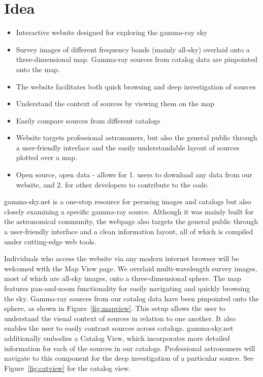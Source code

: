 \section{Idea}

\begin{itemize}

\item Interactive website designed for exploring the gamma-ray sky

\item Survey images of different frequency bands (mainly all-sky) overlaid onto a three-dimensional map. Gamma-ray sources from catalog data are pinpointed onto the map.

\item The website facilitates both quick browsing and deep investigation of sources

\item Understand the context of sources by viewing them on the map

\item Easily compare sources from different catalogs

\item Website targets professional astronomers, but also the general public through
a user-friendly interface and the easily understandable layout of sources plotted over a map.

\item Open source, open data - allows for 1. users to download any data from our website, and 2. for other developers to contribute to the code.

\end{itemize}


    gamma-sky.net is a one-stop resource for perusing images and catalogs but also closely examining a specific gamma-ray source.
    Although it was mainly built for the astronomical community, the webpage also targets the general public through a
    user-friendly interface and a clean information layout, all of which is compiled under cutting-edge web tools.

    Individuals who access the website via any modern internet browser will be welcomed with the Map View page.
    We overlaid multi-wavelength survey images, most of which are all-sky images, onto a three-dimensional sphere.
    The map features pan-and-zoom functionality for easily navigating and quickly browsing the sky. Gamma-ray sources from
    our catalog data have been pinpointed onto the sphere, as shown in Figure~\ref{fig:mapview}. This setup allows the user to understand
    the visual context of sources in relation to one another. It also enables the user to easily contrast sources across catalogs.
    gamma-sky.net additionally embodies a Catalog View, which incorporates more detailed information for each of the sources in our catalogs.
    Professional astronomers will navigate to this component for the deep investigation of a particular source.
    See Figure~\ref{fig:catview} for the catalog view.

